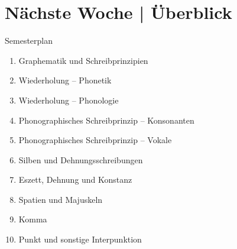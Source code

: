 \ifdefined\TITLE
  \section{Nächste Woche | Überblick}

  \begin{frame}
    {Semesterplan}
    \begin{enumerate}
      \item Graphematik und Schreibprinzipien
      \item \alert{Wiederholung -- Phonetik}
      \item Wiederholung -- Phonologie
      \item Phonographisches Schreibprinzip -- Konsonanten
      \item Phonographisches Schreibprinzip -- Vokale
      \item Silben und Dehnungsschreibungen
      \item Eszett, Dehnung und Konstanz
      \item Spatien und Majuskeln
      \item Komma
      \item Punkt und sonstige Interpunktion
    \end{enumerate}
  \end{frame}
\fi

